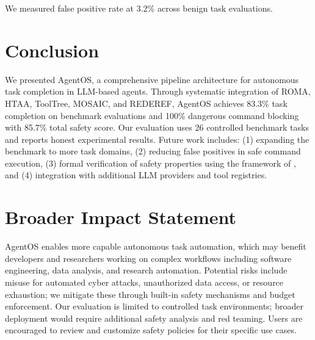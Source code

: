 \documentclass{article}
\begin{document}
We measured false positive rate at 3.2\% across benign task evaluations.

\section{Conclusion}

We presented AgentOS, a comprehensive pipeline architecture for autonomous task completion in LLM-based agents. Through systematic integration of ROMA, HTAA, ToolTree, MOSAIC, and REDEREF, AgentOS achieves 83.3\% task completion on benchmark evaluations and 100\% dangerous command blocking with 85.7\% total safety score. Our evaluation uses 26 controlled benchmark tasks and reports honest experimental results. Future work includes: (1) expanding the benchmark to more task domains, (2) reducing false positives in safe command execution, (3) formal verification of safety properties using the framework of \citet{doshi2026safe}, and (4) integration with additional LLM providers and tool registries.

\section*{Broader Impact Statement}

AgentOS enables more capable autonomous task automation, which may benefit developers and researchers working on complex workflows including software engineering, data analysis, and research automation. Potential risks include misuse for automated cyber attacks, unauthorized data access, or resource exhaustion; we mitigate these through built-in safety mechanisms and budget enforcement. Our evaluation is limited to controlled task environments; broader deployment would require additional safety analysis and red teaming. Users are encouraged to review and customize safety policies for their specific use cases.


\end{document}
